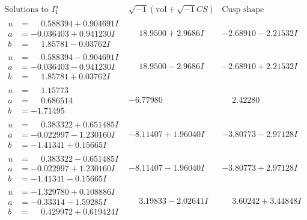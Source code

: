\documentclass[1p]{elsarticle_modified}
\theoremstyle{definition}
\newcommand{\I}{\sqrt{-1}}
\begin{document}
$$\begin{array}{c|c|c}  
\text{Solutions to }I^u_{1}& \I (\text{vol} + \sqrt{-1}CS) & \text{Cusp shape}\\
 \hline 
\begin{aligned}
u &= \phantom{-}0.588394 + 0.904691 I \\
a &= -0.036403 + 0.941230 I \\
b &= \phantom{-}1.85781 - 0.03762 I\end{aligned}
 & \phantom{-}18.9500 + 2.9686 I & -2.68910 - 2.21532 I \\ \hline\begin{aligned}
u &= \phantom{-}0.588394 - 0.904691 I \\
a &= -0.036403 - 0.941230 I \\
b &= \phantom{-}1.85781 + 0.03762 I\end{aligned}
 & \phantom{-}18.9500 - 2.9686 I & -2.68910 + 2.21532 I \\ \hline\begin{aligned}
u &= \phantom{-}1.15773\phantom{ +0.000000I} \\
a &= \phantom{-}0.686514\phantom{ +0.000000I} \\
b &= -1.71495\phantom{ +0.000000I}\end{aligned}
 & -6.77980\phantom{ +0.000000I} & \phantom{-}2.42280\phantom{ +0.000000I} \\ \hline\begin{aligned}
u &= \phantom{-}0.383322 + 0.651485 I \\
a &= -0.022997 - 1.230160 I \\
b &= -1.41341 + 0.15665 I\end{aligned}
 & -8.11407 + 1.96040 I & -3.80773 - 2.97128 I \\ \hline\begin{aligned}
u &= \phantom{-}0.383322 - 0.651485 I \\
a &= -0.022997 + 1.230160 I \\
b &= -1.41341 - 0.15665 I\end{aligned}
 & -8.11407 - 1.96040 I & -3.80773 + 2.97128 I \\ \hline\begin{aligned}
u &= -1.329780 + 0.108886 I \\
a &= -0.33314 - 1.59285 I \\
b &= \phantom{-}0.429972 + 0.619424 I\end{aligned}
 & \phantom{-}3.19833 - 2.02641 I & \phantom{-}3.60242 + 3.44848 I \\ \hline\begin{aligned}

\end{aligned}
\end{array}$$
\end{document}
